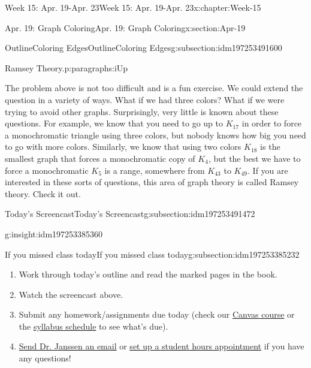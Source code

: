 \documentclass[oneside,10pt,]{book}
\numberwithin{equation}{section}
\begin{document}
\begin{chapterptx}{Week 15: Apr. 19-Apr. 23}{}{Week 15: Apr. 19-Apr. 23}{}{}{x:chapter:Week-15}
\begin{sectionptx}{Apr. 19: Graph Coloring}{}{Apr. 19: Graph Coloring}{}{}{x:section:Apr-19}
\begin{subsectionptx}{OutlineColoring Edges}{}{OutlineColoring Edges}{}{}{g:subsection:idm197253491600}
\begin{paragraphs}{Ramsey Theory.}{p:paragraphs:iUp}
\par
The problem above is not too difficult and is a fun exercise. We could extend the question in a variety of ways. What if we had three colors? What if we were trying to avoid other graphs. Surprisingly, very little is known about these questions. For example, we know that you need to go up to \(K_{17}\) in order to force a monochromatic triangle using three colors, but nobody knows how big you need to go with more colors. Similarly, we know that using two colors \(K_{18}\) is the smallest graph that forces a monochromatic copy of \(K_4\), but the best we have to force a monochromatic \(K_{5}\) is a range, somewhere from \(K_{43}\) to \(K_{49}\). If you are interested in these sorts of questions, this area of graph theory is called Ramsey theory. Check it out.%
\end{paragraphs}%
\end{subsectionptx}
%
%
\typeout{************************************************}
\typeout{************************************************}
%
\begin{subsectionptx}{Today's Screencast}{}{Today's Screencast}{}{}{g:subsection:idm197253491472}
\begin{insight}{}{g:insight:idm197253385360}%
\end{insight}
\end{subsectionptx}
%
%
\typeout{************************************************}
\typeout{************************************************}
%
\begin{subsectionptx}{If you missed class today}{}{If you missed class today}{}{}{g:subsection:idm197253385232}
%
\begin{enumerate}
\item{}Work through today's outline and read the marked pages in the book.%
\item{}Watch the screencast above.%
\item{}Submit any homework\slash{}assignments due today (check our \href{https://dordt.instructure.com/courses/3110050}{Canvas course} or the \href{https://prof.mkjanssen.org/ds/index.html\#schedule}{syllabus schedule} to see what's due).%
\item{}\href{mailto:mike.janssen@dordt.edu}{Send Dr. Janssen an email} or \href{https://calendly.com/mkjanssen/student-hours}{set up a student hours appointment} if you have any questions!%
\end{enumerate}
\end{subsectionptx}

\end{sectionptx}
\end{chapterptx}
\end{document}
